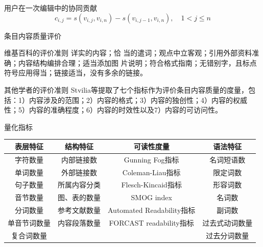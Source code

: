 \documentclass[slidestop,compress,mathserif,table]{beamer}
\begin{document}
 \begin{frame}{用户在一次编辑中的协同贡献}
   \[
c_{i,j}=s(v_{i,j},v_{i,n})-s(v_{i,j-1},v_{i,n}), \quad 1<j \leq n
\]
   \scalebox{0.85}{}
 \end{frame}

 \begin{frame}{条目内容质量评价}
   \begin{block}{维基百科的评价准则}
     详实的内容；恰
当的遣词；观点中立客观；引用外部资料准确；内容结构编排合理；适当添加图
片说明；符合格式指南；无错别字，且标点符号应用得当；链接适当，没有多余的链接。
   \end{block}
    \vfill
   \begin{block}{其他学者的评价准则}
     Stvilia等提取了七个指标作为评价条目内容质量的度量，包
括：1）内容涉及的范围；2）内容的格式；3）内容的独创性；4）内容的权威
性；5）内容的准确程度；6）内容的时效性以及7）内容的可访问性。
   \end{block}
 \end{frame}

 \begin{frame}{量化指标}
 \scriptsize
    \begin{tabular}{|c|c|c|c|}
 
    \hline
    表层特征&结构特征&可读性度量&语法特征\\\hline
    字符数量&内部链接数\footnotemark[1]&Gunning Fog指标&名词短语数\\\hline
    单词数量&外部链接数\footnotemark[2]&Coleman-Liau指标&限定词数\\\hline
    句子数量&所属内容分类&Flesch-Kincaid指标&形容词数\\\hline
    音节数量&图、表的数量&SMOG index&名词数\\\hline
    分词数量&参考文献数量&Automated Readability指标&副词数\\\hline
    单音节词数量&内容段落数量&FORCAST readability指标&过去式动词数量\\\hline
    复合词数量& & &过去分词数量\\\hline
  \end{tabular}
 \end{frame}
\end{document}
